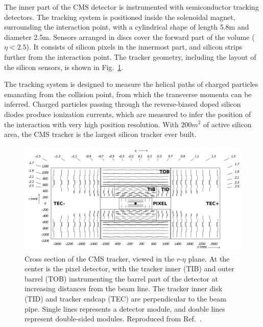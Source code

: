 The inner part of the CMS detector is instrumented with semiconductor tracking detectors.
The tracking system is positioned inside the solenoidal magnet, surrounding the interaction point,
with a cylindrical shape of length 5.8\unit{m} and diameter 2.5\unit{m}. 
Sensors arranged in discs cover the forward part of the volume ($\eta < 2.5$).
It consists of silicon pixels in the innermost part, and silicon strips further from
the interaction point. The tracker geometry, including the layout of the silicon 
sensors, is shown in Fig.~\ref{fig:trackerCrossSec}.

The tracking system is designed to measure the helical paths of charged
particles emanating from the collision point, from which the transverse
momenta can be inferred. Charged particles passing through
the reverse-biased doped silicon diodes produce ionization currents, which are measured
to infer the position of the interaction with very high position resolution. 
With $200\unit{m}^2$ of active silicon area, the CMS tracker is the largest
silicon tracker ever built.

\begin{figure}[htbp]
  \centering
   \includegraphics[width=\textwidth]{figures/LHCandCMS/trackerCrossSection.png}
  \caption{
    Cross section of the CMS tracker, viewed in the $r$-$\eta$ plane.
    At the center is the pixel detector, with the tracker inner (TIB) and
    outer barrel (TOB) instrumenting the barrel part of the detector
    at increasing distances from the beam line. The tracker inner disk (TID)
    and tracker endcap (TEC) are perpendicular to the beam pipe.
    Single lines represents a detector module, and double lines represent
    double-sided modules. Reproduced from Ref.~\cite{Chatrchyan:2009aa}.
        }
 \label{fig:trackerCrossSec}
\end{figure}

